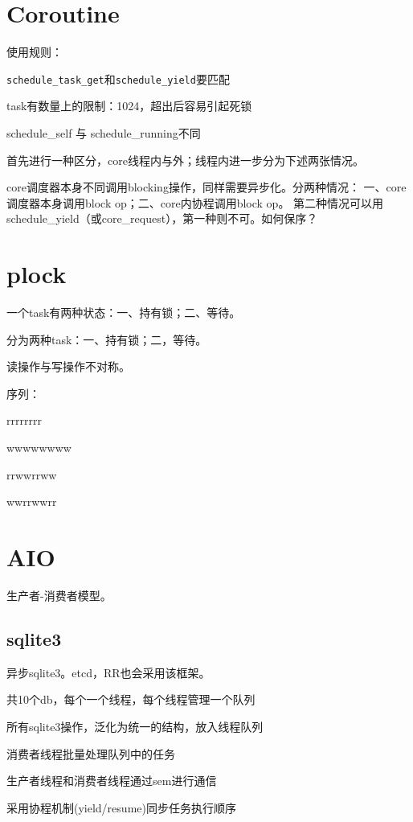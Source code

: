 \section{Coroutine}

使用规则：
\begin{compactitem}
    \item \verb|schedule_task_get|和\verb|schedule_yield|要匹配
    \item task有数量上的限制：1024，超出后容易引起死锁
    \item schedule\_self 与 schedule\_running不同
\end{compactitem}

首先进行一种区分，core线程内与外；线程内进一步分为下述两张情况。

core调度器本身不同调用blocking操作，同样需要异步化。分两种情况：
一、core调度器本身调用block op；二、core内协程调用block op。
第二种情况可以用schedule\_yield（或core\_request），第一种则不可。如何保序？

\section{plock}

一个task有两种状态：一、持有锁；二、等待。

分为两种task：一、持有锁；二，等待。

读操作与写操作不对称。

序列：
\begin{enumbox}
\item rrrrrrrr
\item wwwwwwww
\item rrwwrrww
\item wwrrwwrr
\end{enumbox}

\section{AIO}

生产者-消费者模型。

\subsection{sqlite3}

异步sqlite3。etcd，RR也会采用该框架。

\begin{compactitem}
    \item 共10个db，每个一个线程，每个线程管理一个队列
    \item 所有sqlite3操作，泛化为统一的结构，放入线程队列
    \item 消费者线程批量处理队列中的任务
    \item 生产者线程和消费者线程通过sem进行通信
    \item 采用协程机制(yield/resume)同步任务执行顺序
\end{compactitem}

